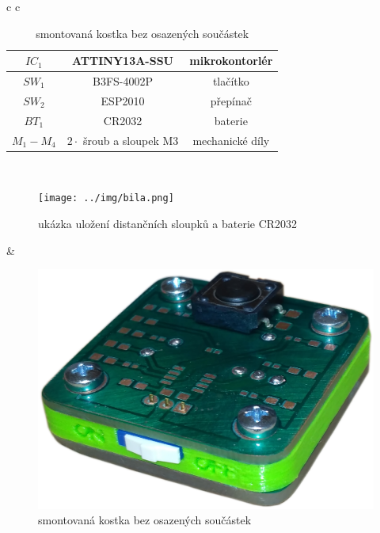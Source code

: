 \begin{table}[H]
\begin{center}
\begin{tabular}{c c}
\begin{minipage}{0.48\textwidth}
\begin{table}[H]
\begin{tabular}{c | c | c}
        		$IC_1$ & ATTINY13A-SSU & mikrokontorlér \\\hline
        		$SW_1$ & B3FS-4002P & tlačítko \\\hline
        		$SW_2$ & ESP2010 & přepínač \\\hline
        		$BT_1$ & CR2032 & baterie \\\hline
        		$M_1 - M_4$ & $2\cdot$ šroub a sloupek M3  & mechanické díly
        	\end{tabular}
        \end{table}
      \end{minipage}
      \\
      \begin{minipage}{0.48\textwidth}
        \begin{figure}[H]
          \centering
          \texttt{[image: ../img/bila.png]}
          \caption{ukázka uložení distančních sloupků a baterie CR2032}
          \label{img:6}
        \end{figure}
      \end{minipage}
  			&  				
      \begin{minipage}{0.48\textwidth}
        \begin{figure}[H]
          \centering
          \includegraphics[width=\textwidth]{../img/zelena.png}
          \caption{smontovaná kostka bez osazených součástek}
          \label{img:7}
        \end{figure}
      \end{minipage}
    \end{tabular}
  \end{center}	
\end{table}

